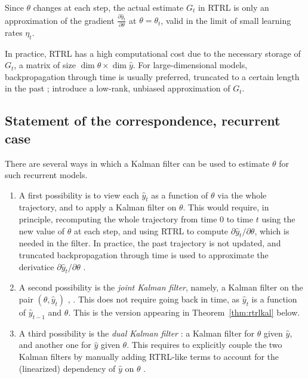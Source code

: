 \documentclass[11pt,a4paper]{article}
\newcommand{\1}{\mathbbm{1}}
\theoremstyle{yannthm}
\theoremstyle{yannthm2}
\numberwithin{equation}{section}
\begin{document}
Since $\theta$ changes at each step, the actual estimate $G_t$ in RTRL is
only an approximation of the gradient $\frac{\partial \hat y_t}{\partial
\theta}$ at $\theta=\theta_t$, valid in the limit of small learning rates $\eta_t$.

In practice, RTRL has a high computational cost due to the necessary
storage of $G_t$, a matrix of size $\dim\theta\times \dim \hat y$. For
large-dimensional models, backpropagation through time is usually
preferred, truncated to a certain length in the past
\cite{Jaeger_tutorial}; \cite{nobacktrack,uoro} introduce a low-rank,
unbiased approximation of $G_t$.

\subsection{Statement of the correspondence, recurrent case}
\label{sec:rec_statement}

There are several ways in which a Kalman filter can be used to
estimate $\theta$ for such recurrent models.
\begin{enumerate}
\item A first possibility is to view each $\hat y_t$ as a function of $\theta$
via the whole trajectory, and to apply a Kalman filter on $\theta$. This
would require, in principle, recomputing the whole trajectory from time
$0$ to time $t$ using the new value of $\theta$ at each step, and using
RTRL to compute $\partial \hat y_t/\partial \theta$, which is needed in
the filter. In
practice, the past trajectory is not updated, and truncated backpropagation
through time is used to approximate the derivatice $\partial \hat
y_t/\partial \theta$ \cite{Jaeger_tutorial, Haykin_book}.
\item A second possibility is the \emph{joint Kalman filter},
namely, a Kalman filter on the pair
$(\theta,\hat y_t)$ \cite[\S5]{Haykin_book},
\cite[\S13.4]{simon2006kalmanbook}.
This does not require going back in time, as $\hat
y_{t}$ is a function of $\hat y_{t-1}$ and $\theta$. This 
is the version appearing in
Theorem~\ref{thm:rtrlkal} below. 
\item A third possibility is the \emph{dual Kalman filter}
\cite{WN96dual}: a
Kalman filter for $\theta$ given $\hat y$, and another one for $\hat y$
given $\theta$. This requires to explicitly couple the two Kalman filters
by manually adding RTRL-like terms to account for the (linearized) dependency of
$\hat y$ on $\theta$ \cite[\S5]{Haykin_book}.
\end{enumerate}
\end{document}
